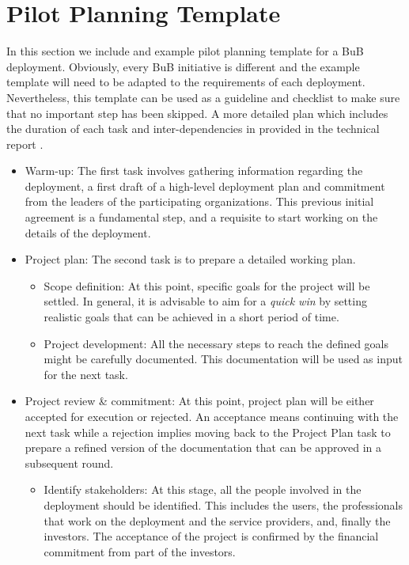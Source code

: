 \documentclass[conference]{IEEEtran}
\begin{document}
\section{Pilot Planning Template}
In this section we include and example pilot planning template for a BuB deployment. 
Obviously, every BuB initiative is different and the example template will need to be adapted to the requirements of each deployment.
Nevertheless, this template can be used as a guideline and checklist to make sure that no important step has been skipped.
A more detailed plan which includes the duration of each task and inter-dependencies in provided in the technical report \cite{barcelo2012bpp}.


\begin{itemize}
  \item{Warm-up:} 
  The first task involves gathering information regarding the deployment, a first draft of a high-level deployment plan and commitment from the leaders of the participating organizations.
  This previous initial agreement is a fundamental step, and a requisite to start working on the details of the deployment.
  \item{Project plan:}
  The second task is to prepare a detailed working plan.
  \begin{itemize}
    \item{Scope definition:}
    At this point, specific goals for the project will be settled.
    In general, it is advisable to aim for a \emph{quick win} by setting realistic goals that can be achieved in a short period of time.
    \item{Project development:}
    All the necessary steps to reach the defined goals might be carefully documented.
    This documentation will be used as input for the next task.
  \end{itemize}
  \item{Project review \& commitment:}
  At this point, project plan will be either accepted for execution or rejected.
  An acceptance means continuing with the next task while a rejection implies moving back to the Project Plan task to prepare a refined version of the documentation that can be approved in a subsequent round.
  \begin{itemize}
    \item{Identify stakeholders:}
    At this stage, all the people involved in the deployment should be identified.
    This includes the users, the professionals that work on the deployment and the service providers, and, finally the investors.
    The acceptance of the project is confirmed by the financial commitment from part of the investors.

\end{itemize}
\end{itemize}
\end{document}

